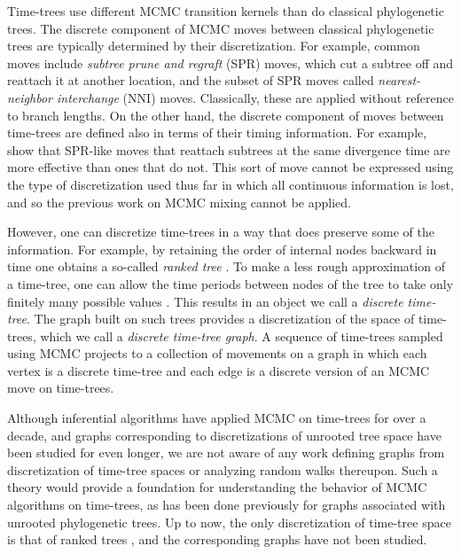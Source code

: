 \documentclass[11pt]{amsart}
\theoremstyle{definition}
\newcommand{\nni}{\mathrm{NNI}}
\begin{document}
Time-trees use different MCMC transition kernels than do classical phylogenetic trees.
The discrete component of MCMC moves between classical phylogenetic trees are typically determined by their discretization.
For example, common moves include \emph{subtree prune and regraft} (SPR) moves, which cut a subtree off and reattach it at another location, and the subset of SPR moves called \emph{nearest-neighbor interchange} ($\nni$) moves.
Classically, these are applied without reference to branch lengths.
On the other hand, the discrete component of moves between time-trees are defined also in terms of their timing information.
For example, \textcite{Hohna2008-vl} show that SPR-like moves that reattach subtrees at the same divergence time are more effective than ones that do not.
This sort of move cannot be expressed using the type of discretization used thus far in which all continuous information is lost, and so the previous work on MCMC mixing cannot be applied.

However, one can discretize time-trees in a way that does preserve some of the information.
For example, by retaining the order of internal nodes backward in time one obtains a so-called \emph{ranked tree} \autocite{Semple2003-nj}.
To make a less rough approximation of a time-tree, one can allow the time periods between nodes of the tree to take only finitely many possible values \autocite{Akerborg2008-cl}.
This results in an object we call a \emph{discrete time-tree}.
The graph built on such trees provides a discretization of the space of time-trees, which we call a \emph{discrete time-tree graph}.
A sequence of time-trees sampled using MCMC projects to a collection of movements on a graph in which each vertex is a discrete time-tree and each edge is a discrete version of an MCMC move on time-trees.

Although inferential algorithms have applied MCMC on time-trees for over a decade, and graphs corresponding to discretizations of unrooted tree space have been studied for even longer, we are not aware of any work defining graphs from discretization of time-tree spaces or analyzing random walks thereupon.
Such a theory would provide a foundation for understanding the behavior of MCMC algorithms on time-trees, as has been done previously for graphs associated with unrooted phylogenetic trees.
Up to now, the only discretization of time-tree space is that of ranked trees \autocite{Page1991-rd,Ford2009-qi,Lambert2013-mr}, and the corresponding graphs have not been studied.
\end{document}
